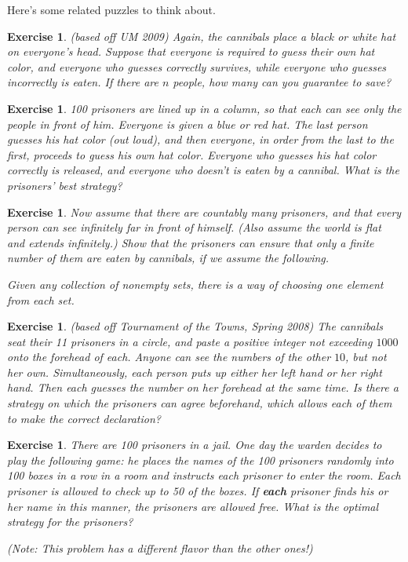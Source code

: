 \documentclass[12pt,twoside]{article}
\theoremstyle{norm}
\newtheorem{exr}[thm]{Exercise}
\begin{document}
Here's some related puzzles to think about.
\begin{exr}(based off UM 2009)
Again, the cannibals place a black or white hat on everyone's head. Suppose that everyone is required to guess their own hat color, and everyone who guesses correctly survives, while everyone who guesses incorrectly is eaten. If there are $n$ people, how many can you guarantee to save?
\end{exr}
\begin{exr}
100 prisoners are lined up in a column, so that each can see only the people in front of him. Everyone is given a blue or red hat. The last person guesses his hat color (out loud), and then everyone, in order from the last to the first, proceeds to guess his own hat color. Everyone who guesses his hat color correctly is released, and everyone who doesn't is eaten by a cannibal. What is the prisoners' best strategy?
\end{exr}
\begin{exr}
Now assume that there are countably many prisoners, and that every person can see infinitely far in front of himself. (Also assume the world is flat and extends infinitely.) Show that the prisoners can ensure that only a finite number of them are eaten by cannibals, if we assume the following.

 Given any collection of nonempty sets, there is a way of choosing one element from each set.
\end{exr}
\begin{exr}(based off Tournament of the Towns, Spring 2008) The cannibals seat their 11 prisoners in a circle, and paste a positive integer not exceeding $1000$ onto the forehead of each. Anyone can see the numbers of the other $10$, but not her own. 
Simultaneously, each person puts up either her left hand or her right hand. Then each guesses 
the number on her forehead at the same time. Is there a strategy on which the prisoners can 
agree beforehand, which allows each of them to make the correct declaration?
\end{exr}
\begin{exr}
There are 100 prisoners in a jail. One day the warden decides to play the following game: he places the names of the 100 prisoners randomly into 100 boxes in a row in a room and instructs each prisoner to enter the room. Each prisoner is allowed to check up to 50 of the boxes. If \textbf{each} prisoner finds his or her name in this manner, the prisoners are allowed free. What is the optimal strategy for the prisoners?

(Note: This problem has a different flavor than the other ones!)
\end{exr}
\end{document}

